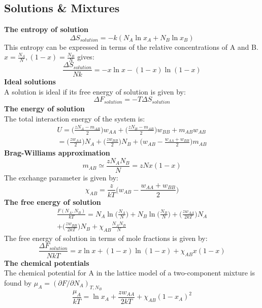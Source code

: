 \documentclass[8pt]{article}
\numberwithin{equation}{section}
\begin{document}
\begin{multicols}{2}
\section{Solutions \& Mixtures}
\textbf{The entropy of solution}
\begin{equation} 
\Delta S_{solution}=-k(N_{A}\ln{x_{A}}+N_{B}\ln{x_{B}}) \tag{15.3}
\end{equation}
This entropy can be expressed in terms of the relative concentrations of A and B. $x=\frac{N_{A}}{N}, (1-x)=\frac{N_{B}}{N}$ gives:
\begin{equation}
\frac{\Delta S_{solution}}{Nk}=-x\ln{x}-(1-x)\ln{(1-x)} \tag{15.4}
\end{equation}
\textbf{Ideal solutions} \\
A solution is ideal if its free energy of solution is given by: 
\begin{equation}
\Delta F_{solution}=-T\Delta S_{solution} \tag{-}
\end{equation}
\textbf{The energy of solution}\\
The total interaction energy of the system is: 
\begin{gather}
U=\bigg(\frac{zN_{A}-m_{AB}}{2}\bigg)w_{AA}+\bigg(\frac{zN_{B}-m_{AB}}{2}\bigg)w_{BB} +m_{AB}w_{AB}  \tag{15.9} \\ =\bigg(\frac{zw_{AA}}{2}\bigg)N_{A}+\bigg(\frac{zw_{BB}}{2}\bigg)N_{B}+\bigg(w_{AB}-\frac{w_{AA}+w_{BB}}{2}\bigg)m_{AB} \tag{-}
\end{gather}
\textbf{Brag-Williams approximation}\\ 
\begin{equation}
m_{AB}\simeq \frac{zN_{A}N_{B}}{N}=zNx(1-x) \tag{15.11}
\end{equation}
The exchange parameter is given by: 
\begin{equation}
\chi_{AB}=\frac{z}{kT}\bigg(w_{AB}-\frac{w_{AA}+w_{BB}}{2}\bigg) \tag{15.13}
\end{equation}
\textbf{The free energy of solution} \\
\begin{gather}
\frac{F(N_{A},N_{B})}{kT}=N_{A}\ln{\bigg(\frac{N_{A}}{N} \bigg)}+ N_{B}\ln{\bigg(\frac{N_{B}}{N} \bigg)} +\bigg(\frac{zw_{AA}}{2kT}\bigg)N_{A} \\+\bigg(\frac{zw_{BB}}{2kT}\bigg)N_{B} +\chi_{AB}\frac{N_{A}N_{B}}{N} \tag{15.14}
\end{gather}
The free energy of solution in terms of mole fractions is given by: 
\begin{equation}
\frac{\Delta F_{solution}}{NkT}=x\ln{x}+(1-x)\ln{(1-x)}+\chi_{AB}x(1-x) \tag{15.16}
\end{equation}
\textbf{The chemical potentials}\\
The chemical potential for A in the lattice model of a two-component mixture is found by $\mu_{A}=(\partial F/\partial N_{A})_{T,N_{B}}$
\begin{equation}
\frac{\mu_{A}}{kT}=\ln{x_{A}}+\frac{zw_{AA}}{2kT}+\chi_{AB}(1-x_{A})^{2} \tag{15.17}
\end{equation} 

\end{multicols}
\end{document}
